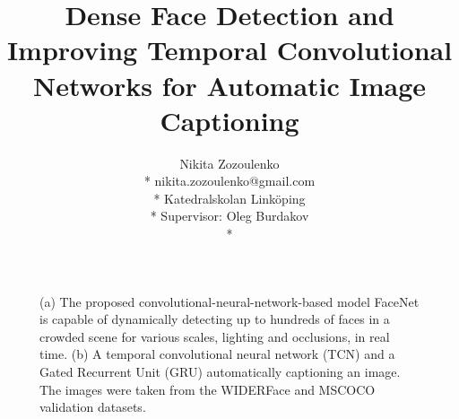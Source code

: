 \documentclass[a4paper, twoside]{article}
\title{Dense Face Detection and Improving Temporal Convolutional Networks for Automatic Image Captioning}
\author{Nikita Zozoulenko \\*
nikita.zozoulenko@gmail.com \\*
Katedralskolan Linköping\\*
Supervisor: Oleg Burdakov \\*}
\begin{document}
\maketitle
\thispagestyle{empty}

\vfill
\begin{figure}[h]
    \centering
  	\caption{(a) The proposed convolutional-neural-network-based model FaceNet is capable of dynamically detecting up to hundreds of faces in a crowded scene for various scales, lighting and occlusions, in real time. (b) A temporal convolutional neural network (TCN) and a Gated Recurrent Unit (GRU) automatically captioning an image. The images were taken from the WIDERFace \cite{WIDERFace} and MSCOCO \cite{mscoco} validation datasets.} \label{figtitle}
\end{figure}
\vfill
\end{document}
